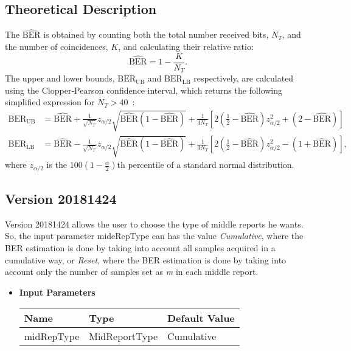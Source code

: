 \begin{refsection}
\subsection*{Theoretical Description}\label{bercalc}
The $\widehat{\text{BER}}$ is obtained by counting both the total number received bits, $N_T$, and the number of coincidences, $K$, and calculating their relative ratio:
\begin{equation}
\widehat{\text{BER}}=1-\frac{K}{N_T}.
\end{equation}
The upper and lower bounds, $\text{BER}_\text{UB}$ and $\text{BER}_\text{LB}$ respectively, are calculated using the Clopper-Pearson confidence interval, which returns the following simplified expression for $N_T>40$~\cite{Almeida16}:
\begin{align}
\text{BER}_\text{UB}&=\widehat{\text{BER}}+\frac{1}{\sqrt{N_T}}z_{\alpha/2}\sqrt{\widehat{\text{BER}}(1-\widehat{\text{BER}})}+\frac{1}{3N_T}\left[2\left(\frac{1}{2}-\widehat{\text{BER}}\right)z_{\alpha/2}^2+(2-\widehat{\text{BER}})\right]\\
\text{BER}_\text{LB}&=\widehat{\text{BER}}-\frac{1}{\sqrt{N_T}}z_{\alpha/2}\sqrt{\widehat{\text{BER}}(1-\widehat{\text{BER}})}+\frac{1}{3N_T}\left[2\left(\frac{1}{2}-\widehat{\text{BER}}\right)z_{\alpha/2}^2-(1+\widehat{\text{BER}})\right],
\end{align}
where $z_{\alpha/2}$ is the $100\left(1-\frac{\alpha}{2}\right)$th percentile of a standard normal distribution.

\subsection*{Version 20181424}

Version 20181424 allows the user to choose the type of middle reports he wants. So, the input parameter \textrm{mideRepType} can has the value \textit{Cumulative}, where the BER estimation is done by taking into account all samples acquired in a cumulative way, or \textit{Reset}, where the BER estimation is done by taking into account only the number of samples set as \textit{m} in each middle report.

\begin{itemize}
  \item \textbf{Input Parameters}
  \begin{table}[H]
    \centering
    \begin{tabular}{|l|l|l|}
    \hline
    Name           & Type           & Default Value     \\ \hline
    midRepType     & MidReportType  & Cumulative \\ \hline
    \end{tabular}
  \end{table}
  

\end{itemize}
\end{refsection}

